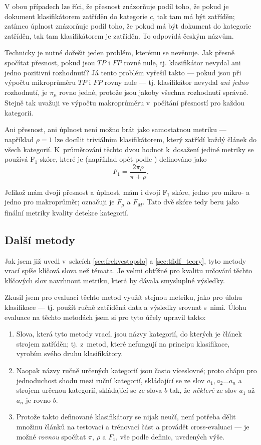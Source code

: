 \documentclass[12pt,a4paper]{report}
\begin{document}
V obou případech lze říci, že přesnost znázorňuje podíl toho, že pokud je dokument klasifikátorem zatříděn do kategorie $c$, tak tam má být zatříděn; zatímco úplnost znázorňuje podíl toho, že pokud má být dokument do kategorie zatříděn, tak tam klasifikátorem je zatříděn. To odpovídá českým názvům. 

Technicky je nutné dořešit jeden problém, kterému se \cite{machine_intro} ne\-vě\-nu\-je. Jak přesně spočítat přesnost, pokud jsou $TP$ i $FP$ rovné nule, tj. klasifikátor nevydal ani jedno pozitivní rozhodnutí? Já tento problém vyřešil takto --- pokud jsou při výpočtu mikroprůměru $TP$ i $FP$ rovny nule --- tj. klasifikátor nevydal \emph{ani jedno} rozhodnutí, je $\pi_{\mu}$ rovno jedné, protože jsou jakoby všechna rozhodnutí správně. Stejně tak uvažuji ve výpočtu makroprůměru v~počítání  přesností pro každou kategorii.

Ani přesnost, ani úplnost není možno brát jako samostatnou metriku --- například $\rho=1$ lze docílit triviálním klasifikátorem, který zatřídí každý článek do všech kategorií. K~průměrování těchto dvou hodnot k~dosažení jediné metriky se používá F$_1$-skóre, které je (například opět podle \cite{machine_intro}) definováno jako $$F_1=\frac{2\pi\rho}{\pi+\rho}.$$ 

Jelikož mám dvojí přesnost a úplnost, mám i dvojí F$_1$ skóre, jedno pro mikro- a jedno pro makroprůměr; označuji je $F_\mu$ a $F_M$. Tato dvě skóre tedy beru jako finální metriky kvality detekce kategorií.

\subsection{Další metody}
\label{sec:dalsimetody}

Jak jsem již uvedl v~sekcích \ref{sec:frekvestopslo} a \ref{sec:tfidf_teory}, tyto metody vrací spíše klíčová slova než témata. Je velmi obtížné pro kvalitu určování těchto klíčových slov navrhnout metriku, která by dávala smysluplné výsledky.

Zkusil jsem pro evaluaci těchto metod využít stejnou metriku, jako pro úlohu klasifikace --- tj. použít ručně zatříděná data a výsledky srovnat s~nimi. Úlohu evaluace na těchto metodách jsem si pro tyto účely upravil takto:
\begin{enumerate}
    \item Slova, která tyto metody vrací, jsou názvy kategorií, do kterých je článek strojem zatříděn; tj. z~metod, které nefungují na principu klasifikace, vyrobím svého druhu klasifikátory.
    \item Naopak názvy ručně určených kategorií jsou často víceslovné; proto chápu pro jednoduchost shodu mezi ruční kategorií, skládající se ze slov $a_1, a_2 \ldots a_n$ a strojem určenou kategorií, skládající se ze slova $b$ tak, že \emph{některé} ze slov $a_1$ až $a_n$ je rovno $b$.
    \item Protože takto definované klasifikátory se nijak neučí, není potřeba dělit množinu článků na testovací a trénovací část a provádět cross-evaluaci --- je možné \emph{rovnou} spočítat $\pi$, $\rho$ a $F_1$, vše podle definic, uvedených výše.
\end{enumerate}
\end{document}
